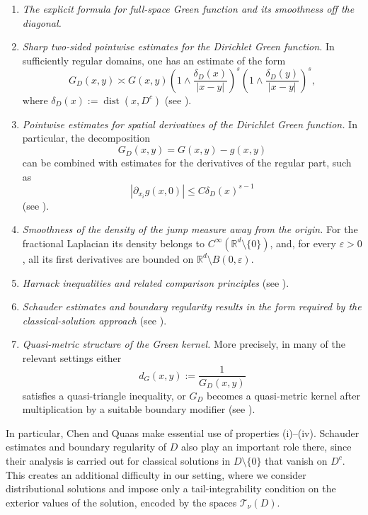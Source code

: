 \documentclass[11pt,a4paper,reqno]{amsart}
\theoremstyle{definition}
\numberwithin{equation}{section}
\begin{document}
\begin{enumerate}
\item[\rm (i)]
\emph{The explicit formula for full-space Green function  and its smoothness off the diagonal.}
\item[\rm (ii)]
\emph{Sharp two-sided pointwise
estimates for the Dirichlet Green function.}
In sufficiently regular domains, one has an estimate of the form
\begin{equation}
\label{green.dircom}
G_D(x,y)
\asymp
G(x,y)
\left(
1\wedge\frac{\delta_D(x)}{|x-y|}
\right)^s
\left(
1\wedge\frac{\delta_D(y)}{|x-y|}
\right)^s,
\end{equation}
where $\delta_D(x):=\operatorname{dist}(x,D^c)$
(see \cite{ChenHuZhao2025,DipierroRosOtonSerraValdinoci2022}).  
\item[\rm (iii)]
\emph{Pointwise estimates for spatial derivatives of the Dirichlet Green
function.}
In particular, the decomposition
\[
G_D(x,y)=G(x,y)-g(x,y)
\]
can be combined with estimates for the derivatives of the regular part,
such as
\[
\left|\partial_{x_i}g(x,0)\right|
\leq C\delta_D(x)^{s-1}
\]
(see \cite{RosOtonSerra2016,Sztonyk2010v1}).
\item[\rm (iv)]
\emph{Smoothness of the density of the jump measure  away from the origin.}
For the fractional Laplacian its density belongs to $C^\infty(\mathbb R^d\setminus\{0\})$, and, 
 for every $\varepsilon>0$, all its first derivatives are
bounded on $\mathbb R^d\setminus B(0,\varepsilon)$.
\item[\rm (v)]
\emph{Harnack inequalities and related comparison principles} (see \cite{BogdanSztonyk2007,DipierroRosOtonSerraValdinoci2022,RosOtonSerra2016}).
\item[\rm (vi)]
\emph{Schauder estimates and boundary regularity results in the form required by the classical-solution approach} (see \cite{RosOtonSerra2016,DipierroRosOtonSerraValdinoci2022}).
\item[\rm (vii)]
\emph{Quasi-metric structure of the Green kernel.}
More precisely, in many of the relevant settings either
\[
d_G(x,y):=\frac{1}{G_D(x,y)}
\]
satisfies a quasi-triangle inequality, or $G_D$ becomes a quasi-metric
kernel after multiplication by a suitable boundary modifier (see \cite{GV,lit:HuynhNguyen2023}).
\end{enumerate}
In particular, Chen and Quaas \cite{lit:ChenQuaas2018} make essential use of properties (i)--(iv). Schauder estimates and boundary regularity of $D$ 
also play an important role there, since their analysis is carried out for classical solutions in $D\setminus{\{0\}}$
that vanish on $D^c$. This creates an additional difficulty in our setting, where we consider 
distributional solutions and 
impose only a tail-integrability condition on the exterior values of the solution, encoded by the spaces
$\mathscr T_\nu(D)$.
\end{document}
